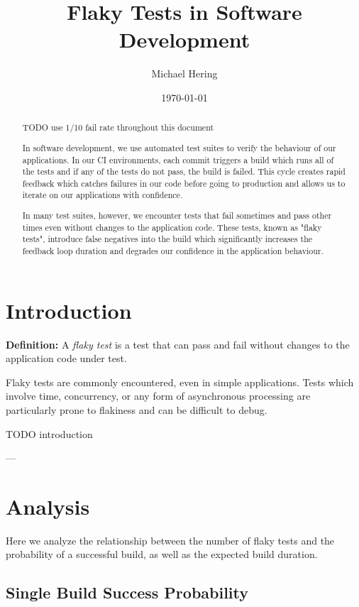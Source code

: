 \documentclass[letterpaper]{article}
\title{Flaky Tests in Software Development}
\author{Michael Hering}
\date{\today}
\begin{document}
\maketitle

\begin{abstract}
    TODO use 1/10 fail rate throughout this document
    
    In software development, we use automated test suites to verify the behaviour of our applications. In our CI environments, each commit triggers a build which runs all of the tests and if any of the tests do not pass, the build is failed. This cycle creates rapid feedback which catches failures in our code before going to production and allows us to iterate on our applications with confidence.

    In many test suites, however, we encounter tests that fail sometimes and pass other times even without changes to the application code. These tests, known as "flaky tests", introduce false negatives into the build which significantly increases the feedback loop duration and degrades our confidence in the application behaviour.
    
\end{abstract}


\section{Introduction}

\textbf{Definition:}  A \textit{flaky test} is a test that can pass and fail without changes to the application code under test.

Flaky tests are commonly encountered, even in simple applications. Tests which involve time, concurrency, or any form of asynchronous processing are particularly prone to flakiness and can be difficult to debug.

TODO introduction

---

\section{Analysis}

Here we analyze the relationship between the number of flaky tests and the probability of a successful build, as well as the expected build duration.

\subsection{Single Build Success Probability}
\end{document}
